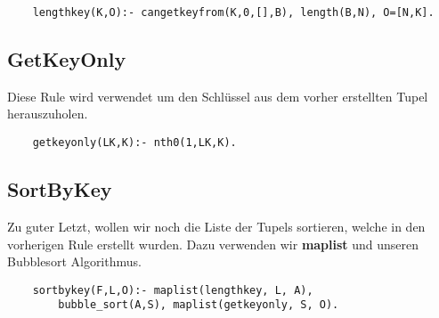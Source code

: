 \begin{verbatim}
    lengthkey(K,O):- cangetkeyfrom(K,0,[],B), length(B,N), O=[N,K].
\end{verbatim}

\subsection{GetKeyOnly}
Diese Rule wird verwendet um den Schlüssel aus dem vorher erstellten Tupel herauszuholen.

\begin{verbatim}
    getkeyonly(LK,K):- nth0(1,LK,K).
\end{verbatim}

\subsection{SortByKey}
Zu guter Letzt, wollen wir noch die Liste der Tupels sortieren, welche in den vorherigen Rule
erstellt wurden. Dazu verwenden wir \textbf{maplist} und unseren Bubblesort Algorithmus.

\begin{verbatim}
    sortbykey(F,L,O):- maplist(lengthkey, L, A), 
        bubble_sort(A,S), maplist(getkeyonly, S, O).
\end{verbatim}